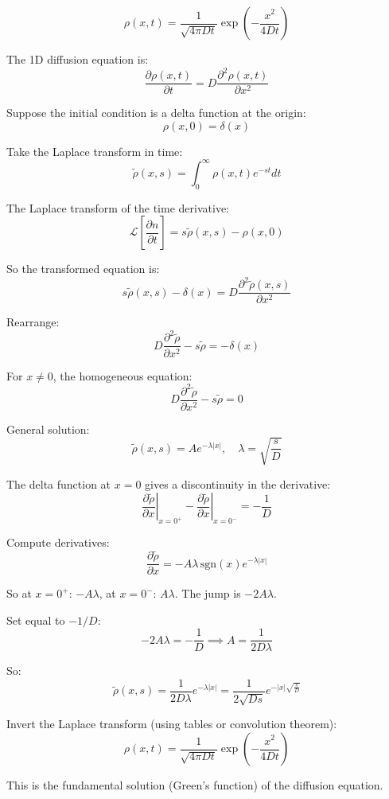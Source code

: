 \documentclass[
  letterpaper,
  enabledeprecatedfontcommands]{report}
\begin{document}
\[
\rho(x, t) = \frac{1}{\sqrt{4\pi D t}} \exp\left(-\frac{x^2}{4Dt}\right)
\]

\begin{tcolorbox}[enhanced jigsaw, leftrule=.75mm, bottomrule=.15mm, toprule=.15mm, colbacktitle=quarto-callout-note-color!10!white, title=\textcolor{quarto-callout-note-color}{\faInfo}\hspace{0.5em}{Solution of the diffusion equation using Laplace transform}, breakable, titlerule=0mm, opacitybacktitle=0.6, colback=white, coltitle=black, colframe=quarto-callout-note-color-frame, bottomtitle=1mm, rightrule=.15mm, toptitle=1mm, left=2mm, opacityback=0, arc=.35mm]

The 1D diffusion equation is: \[
\frac{\partial \rho(x, t)}{\partial t} = D \frac{\partial^2 \rho(x, t)}{\partial x^2}
\]

Suppose the initial condition is a delta function at the origin: \[
\rho(x, 0) = \delta(x)
\]

Take the Laplace transform in time: \[
\tilde{\rho}(x, s) = \int_0^\infty \rho(x, t) e^{-st} dt
\]

The Laplace transform of the time derivative: \[
\mathcal{L}\left[\frac{\partial n}{\partial t}\right] = s\tilde{\rho}(x, s) - \rho(x, 0)
\]

So the transformed equation is: \[
s\tilde{\rho}(x, s) - \delta(x) = D \frac{\partial^2 \tilde{\rho}(x, s)}{\partial x^2}
\]

Rearrange: \[
D \frac{\partial^2 \tilde{\rho}}{\partial x^2} - s\tilde{\rho} = -\delta(x)
\]

For \(x \neq 0\), the homogeneous equation: \[
D \frac{\partial^2 \tilde{\rho}}{\partial x^2} - s\tilde{\rho} = 0
\]

General solution: \[
\tilde{\rho}(x, s) = A e^{-\lambda |x|}, \quad \lambda = \sqrt{\frac{s}{D}}
\]

The delta function at \(x=0\) gives a discontinuity in the derivative:
\[
\left.\frac{\partial \tilde{\rho}}{\partial x}\right|_{x=0^+} - \left.\frac{\partial \tilde{\rho}}{\partial x}\right|_{x=0^-} = -\frac{1}{D}
\]

Compute derivatives: \[
\frac{\partial \tilde{\rho}}{\partial x} = -A \lambda \, \text{sgn}(x) e^{-\lambda |x|}
\]

So at \(x=0^+\): \(-A\lambda\), at \(x=0^-\): \(A\lambda\). The jump is
\(-2A\lambda\).

Set equal to \(-1/D\): \[
-2A\lambda = -\frac{1}{D} \implies A = \frac{1}{2D\lambda}
\]

So: \[
\tilde{\rho}(x, s) = \frac{1}{2D\lambda} e^{-\lambda |x|} = \frac{1}{2\sqrt{Ds}} e^{-|x|\sqrt{\frac{s}{D}}}
\]

Invert the Laplace transform (using tables or convolution theorem): \[
\rho(x, t) = \frac{1}{\sqrt{4\pi D t}} \exp\left(-\frac{x^2}{4Dt}\right)
\]

This is the fundamental solution (Green's function) of the diffusion
equation.

\end{tcolorbox}
\end{document}
